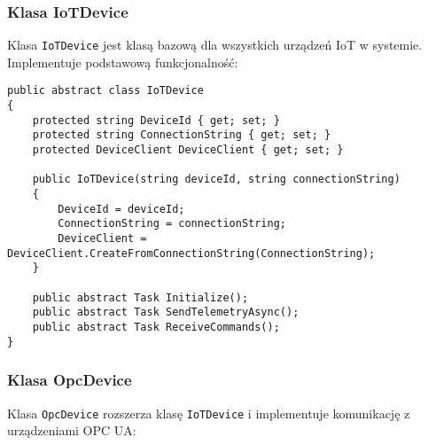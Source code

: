 \documentclass{article}
\begin{document}
\subsubsection{Klasa IoTDevice}
Klasa \texttt{IoTDevice} jest klasą bazową dla wszystkich urządzeń IoT w systemie. Implementuje podstawową funkcjonalność:

\begin{lstlisting}[style=csharp, caption=IoTDevice.cs (fragment)]
public abstract class IoTDevice
{
    protected string DeviceId { get; set; }
    protected string ConnectionString { get; set; }
    protected DeviceClient DeviceClient { get; set; }

    public IoTDevice(string deviceId, string connectionString)
    {
        DeviceId = deviceId;
        ConnectionString = connectionString;
        DeviceClient = DeviceClient.CreateFromConnectionString(ConnectionString);
    }

    public abstract Task Initialize();
    public abstract Task SendTelemetryAsync();
    public abstract Task ReceiveCommands();
}
\end{lstlisting}

\subsubsection{Klasa OpcDevice}
Klasa \texttt{OpcDevice} rozszerza klasę \texttt{IoTDevice} i implementuje komunikację z urządzeniami OPC UA:
\end{document}
